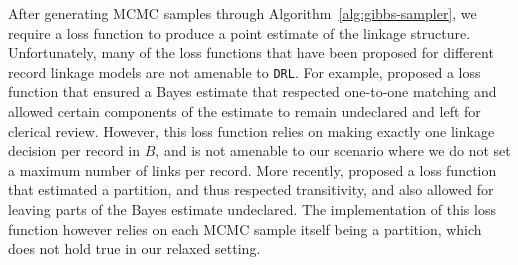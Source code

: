 \documentclass[12pt,letterpaper]{article}
\newcommand{\1}[1]{\mathbb{I}\!\left[#1\right]} %
\begin{document}
After generating MCMC samples through Algorithm~\ref{alg:gibbs-sampler}, we require a loss function to produce a point estimate of the linkage structure. Unfortunately, many of the loss functions that have been proposed for different record linkage models are not amenable to \texttt{DRL}. For example, \cite{sadinle_bayesian_2017} proposed a loss function that ensured a Bayes estimate that respected one-to-one matching and allowed certain components of the estimate to remain undeclared and left for clerical review. However, this loss function relies on making exactly one linkage decision per record in $B$, and is not amenable to our scenario where we do not set a maximum number of links per record. More recently, \cite{aleshin2023multifile} proposed a loss function that estimated a partition, and thus respected transitivity, and also allowed for leaving parts of the Bayes estimate undeclared. The implementation of this loss function however relies on each MCMC sample itself being a partition, which does not hold true in our relaxed setting. 
\end{document}

